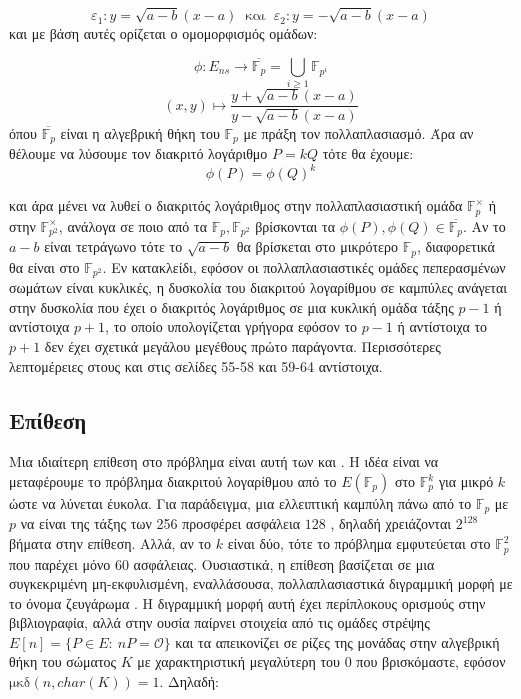 \documentclass[oneside,a4paper]{article}
\begin{document}
$$\varepsilon_1 : y = \sqrt{a-b}(x-a) \ \text{ και } \ \varepsilon_2 : y=-\sqrt{a-b}(x-a)$$ και με βάση αυτές ορίζεται ο ομομορφισμός ομάδων:

$$\phi : E_{ns} \longrightarrow \overline{\mathbb{F}_p} = \bigcup\limits_{i\geq 1} \mathbb{F}_{p^i}$$
$$(x,y) \longmapsto \frac{y+\sqrt{a-b}(x-a)}{y-\sqrt{a-b}(x-a)}$$ όπου $\overline{\mathbb{F}_p}$ είναι η αλγεβρική θήκη του $\mathbb{F}_p$ με πράξη τον πολλαπλασιασμό. Άρα αν θέλουμε να λύσουμε τον διακριτό λογάριθμο $P = kQ$ τότε θα έχουμε:
$$\phi(P)=\phi(Q)^k$$

και άρα μένει να λυθεί ο διακριτός λογάριθμος στην πολλαπλασιαστική ομάδα $\mathbb{F}^{\times}_p$ ή στην $\mathbb{F}^{\times}_{p^2}$, ανάλογα σε ποιο από τα $\mathbb{F}_p, \mathbb{F}_{p^2}$ βρίσκονται τα $\phi(P),\phi(Q) \in \overline{\mathbb{F}_p}$. Αν το $a-b$ είναι τετράγωνο τότε το $\sqrt{a-b}$ θα βρίσκεται στο μικρότερο $\mathbb{F}_p$, διαφορετικά θα είναι στο $\mathbb{F}_{p^2}$. Εν κατακλείδι, εφόσον οι πολλαπλασιαστικές ομάδες πεπερασμένων σωμάτων είναι κυκλικές, η δυσκολία του διακριτού λογαρίθμου σε  καμπύλες ανάγεται στην δυσκολία που έχει ο διακριτός λογάριθμος σε μια κυκλική ομάδα τάξης $p-1$ ή αντίστοιχα $p+1$, το οποίο υπολογίζεται γρήγορα εφόσον το $p-1$ ή αντίστοιχα το $p+1$ δεν έχει σχετικά μεγάλου μεγέθους πρώτο παράγοντα.  
Περισσότερες λεπτομέρειες στους  \cite{silverman} και  \cite{washington} στις σελίδες 55-58 και 59-64 αντίστοιχα.




\subsection{Επίθεση }

Μια ιδιαίτερη επίθεση στο πρόβλημα  είναι αυτή των  και  . Η ιδέα είναι να μεταφέρουμε το πρόβλημα διακριτού λογαρίθμου από το $E(\mathbb{F}_p)$ στο $\mathbb{F}_p^k$ για μικρό $k$ ώστε να λύνεται έυκολα. Για παράδειγμα, μια ελλειπτική καμπύλη πάνω από το $\mathbb{F}_p$ με $p$ να είναι της τάξης των 256  προσφέρει ασφάλεια $128$ , δηλαδή χρειάζονται $2^{128}$ βήματα στην επίθεση. Αλλά, αν το $k$ είναι δύο, τότε το πρόβλημα εμφυτεύεται στο $\mathbb{F}_p^2$ που παρέχει μόνο $60$  ασφάλειας. Ουσιαστικά, η επίθεση βασίζεται σε μια συγκεκριμένη μη-εκφυλισμένη, εναλλάσουσα, πολλαπλασιαστικά διγραμμική μορφή με το όνομα ζευγάρωμα . Η διγραμμική μορφή αυτή έχει περίπλοκους ορισμούς στην βιβλιογραφία, αλλά στην ουσία παίρνει στοιχεία από τις ομάδες στρέψης $E[n]= \{P \in E: \ nP = \mathcal{O}\}$ και τα απεικονίζει σε ρίζες της μονάδας στην αλγεβρική θήκη του σώματος $K$ με χαρακτηριστική μεγαλύτερη του $0$ που βρισκόμαστε, εφόσον $\text{μκδ}(n,char(K)) = 1$. Δηλαδή:
\end{document}

